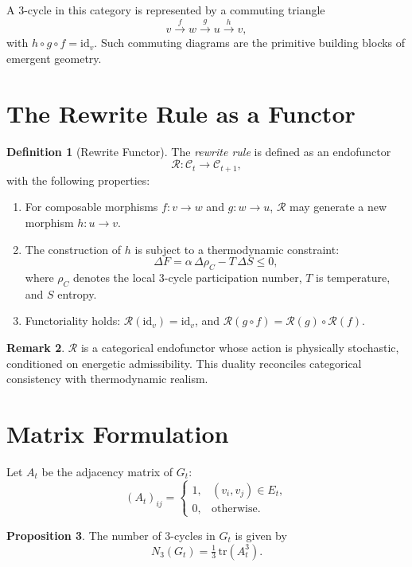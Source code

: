 \documentclass[11pt]{article}
\theoremstyle{definition}
\newtheorem{definition}{Definition}[section]
\newtheorem{proposition}[definition]{Proposition}
\newtheorem{remark}[definition]{Remark}
\begin{document}
A $3$-cycle in this category is represented by a commuting triangle
\[
v \xrightarrow{f} w \xrightarrow{g} u \xrightarrow{h} v,
\]
with $h \circ g \circ f = \mathrm{id}_v$. Such commuting diagrams are the primitive building blocks of emergent geometry.

\section{The Rewrite Rule as a Functor}

\begin{definition}[Rewrite Functor]
The \emph{rewrite rule} is defined as an endofunctor
\[
\mathcal{R} : \mathcal{C}_t \to \mathcal{C}_{t+1},
\]
with the following properties:
\begin{enumerate}
    \item For composable morphisms $f : v \to w$ and $g : w \to u$, $\mathcal{R}$ may generate a new morphism $h : u \to v$.
    \item The construction of $h$ is subject to a thermodynamic constraint:
    \[
    \Delta F = \alpha \, \Delta \rho_C - T \, \Delta S \leq 0,
    \]
    where $\rho_C$ denotes the local 3-cycle participation number, $T$ is temperature, and $S$ entropy.
    \item Functoriality holds: $\mathcal{R}(\mathrm{id}_v) = \mathrm{id}_v$, and $\mathcal{R}(g \circ f) = \mathcal{R}(g) \circ \mathcal{R}(f)$.
\end{enumerate}
\end{definition}

\begin{remark}
$\mathcal{R}$ is a categorical endofunctor whose action is physically stochastic, conditioned on energetic admissibility. This duality reconciles categorical consistency with thermodynamic realism.
\end{remark}

\section{Matrix Formulation}

Let $A_t$ be the adjacency matrix of $G_t$:
\[
(A_t)_{ij} =
\begin{cases}
1, & (v_i, v_j) \in E_t, \\
0, & \text{otherwise}.
\end{cases}
\]

\begin{proposition}
The number of 3-cycles in $G_t$ is given by
\[
N_3(G_t) = \tfrac{1}{3} \, \mathrm{tr}(A_t^3).
\]
\end{proposition}
\end{document}
